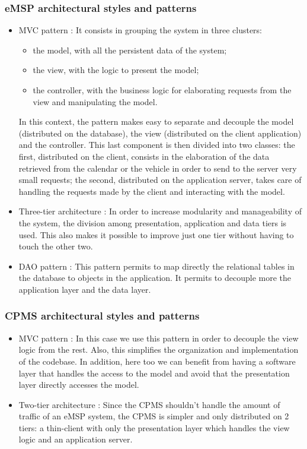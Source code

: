 \subsubsection{\ac{eMSP} architectural styles and patterns}
\begin{itemize}
    \item \acl{MVC} pattern \cite{ref:MVC-pattern}: It consists in grouping the system in three clusters: 
    \begin{itemize}
        \item the model, with all the persistent data of the system;
        \item the view, with the logic to present the model;
        \item the controller, with the business logic for elaborating requests from the view and manipulating the model.
    \end{itemize}
    In this context, the pattern makes easy to separate and decouple the model (distributed on the database), the view (distributed on the client application) and the controller.
    This last component is then divided into two classes:
    the first, distributed on the client, consists in the elaboration of the data retrieved from the calendar or the vehicle in order to send to the server very small requests;
    the second, distributed on the application server, takes care of handling the requests made by the client and interacting with the model.
    \item Three-tier architecture \cite{ref:multitier-pattern}: In order to increase modularity and manageability of the system, the division among presentation, application and data tiers is used. This also makes it possible to improve just one tier without having to touch the other two. 
    \item \ac{DAO} pattern \cite{ref:dao-pattern}: This pattern permits to map directly the relational tables in the database to objects in the application. It permits to decouple more the application layer and the data layer.
\end{itemize}

\subsubsection{\ac{CPMS} architectural styles and patterns}
\begin{itemize}
    \item \acl{MVC} pattern \cite{ref:MVC-pattern}: In this case we use this pattern in order to decouple the view logic from the rest. Also, this simplifies the organization and implementation of the codebase. In addition, here too we can benefit from having a software layer that handles the access to the model and avoid that the presentation layer directly accesses the model.
    \item Two-tier architecture \cite{ref:multitier-pattern}: Since the \ac{CPMS} shouldn't handle the amount of traffic of an \ac{eMSP} system, the \ac{CPMS} is simpler and only distributed on 2 tiers: a thin-client with only the presentation layer which handles the view logic and an application server.
\end{itemize}


